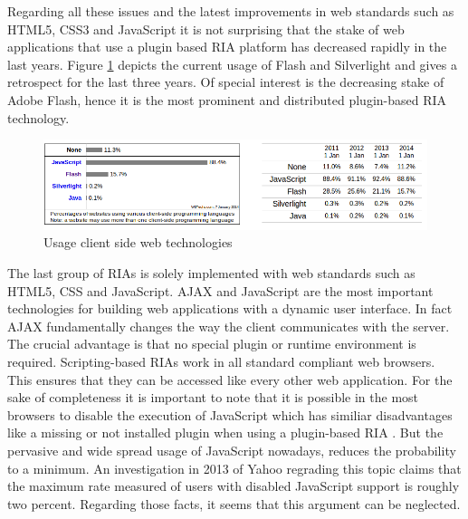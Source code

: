 Regarding all these issues and the latest improvements in web standards such as HTML5, CSS3 and JavaScript it is not surprising that the stake of web applications that use a plugin based RIA platform has decreased rapidly in the last years.
Figure \ref{fig:flash_usage} depicts the current usage of Flash and Silverlight and gives a retrospect for the last three years.
Of special interest is the decreasing stake of Adobe Flash, hence it is the most prominent and distributed plugin-based RIA technology.

\begin{figure}
	\centering \includegraphics[width=1.0\textwidth]{./img/web-dev/flash_usage.png}
	\caption{Usage client side web technologies \autocite[]{ria_flash-usage}}
	\label{fig:flash_usage}
\end{figure}

The last group of RIAs is solely implemented with web standards such as HTML5, CSS and JavaScript.
AJAX and JavaScript are the most important technologies for building web applications with a dynamic user interface. In fact AJAX fundamentally changes the way the client communicates with the server.
The crucial advantage is that no special plugin or runtime environment is required. 
Scripting-based RIAs work in all standard compliant web browsers.
This ensures that they can be accessed like every other web application. 
For the sake of completeness it is important to note that it is possible in the most browsers to disable the execution of JavaScript which has similiar disadvantages like a missing or not installed plugin when using a plugin-based RIA .
But the pervasive and wide spread usage of JavaScript nowadays, reduces the probability to a minimum. An investigation in 2013 of Yahoo regrading this topic \autocite{web-dev:js-disabled} claims that the maximum rate measured of users with disabled JavaScript support is roughly two percent. 
Regarding those facts, it seems that this argument can be neglected.

